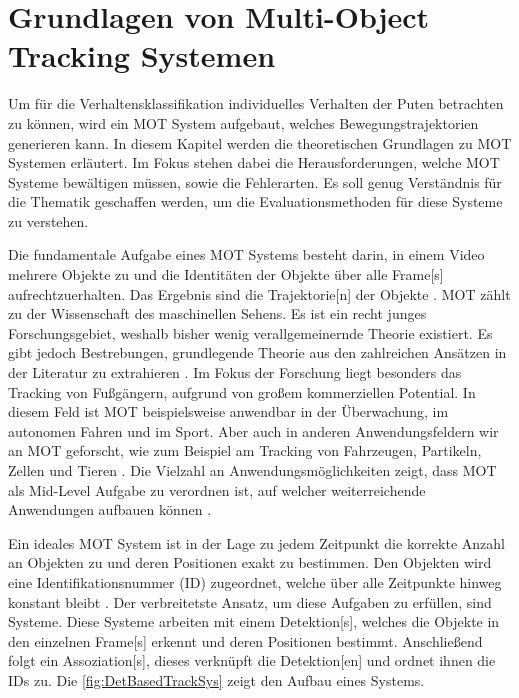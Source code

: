 \section{Grundlagen von Multi-Object Tracking Systemen} \label{sec:MOT Grundlagen}

Um für die Verhaltensklassifikation individuelles Verhalten der Puten betrachten zu können, wird ein \gls{MOT} System aufgebaut, welches Bewegungstrajektorien generieren kann. In diesem Kapitel werden die theoretischen Grundlagen zu \gls{MOT} Systemen erläutert. Im Fokus stehen dabei die Herausforderungen, welche \gls{MOT} Systeme bewältigen müssen, sowie die Fehlerarten. Es soll genug Verständnis für die Thematik geschaffen werden, um die Evaluationsmethoden für diese Systeme zu verstehen. 

Die fundamentale Aufgabe eines \gls{MOT} Systems besteht darin, in einem Video mehrere Objekte zu  und die Identitäten der Objekte über alle \gls{Frame}[s] aufrechtzuerhalten. Das Ergebnis sind die \gls{Trajektorie}[n] der Objekte \cite{CLEAR.2008, HOTA, Luo.2022}. \gls{MOT} zählt zu der Wissenschaft des maschinellen Sehens. Es ist ein recht junges Forschungsgebiet, weshalb bisher wenig verallgemeinernde Theorie existiert. Es gibt jedoch Bestrebungen, grundlegende Theorie aus den zahlreichen Ansätzen in der Literatur zu extrahieren \cite{Luo.2022}. Im Fokus der Forschung liegt besonders das Tracking von Fußgängern, aufgrund von großem kommerziellen Potential. In diesem Feld ist \gls{MOT} beispielsweise anwendbar in der Überwachung, im autonomen Fahren und im Sport. Aber auch in anderen Anwendungsfeldern wir an \gls{MOT} geforscht, wie zum Beispiel am Tracking von Fahrzeugen, Partikeln, Zellen und Tieren \cite{Luo.2022, CLEAR.2008, Crocker.1996}. Die Vielzahl an Anwendungsmöglichkeiten zeigt, dass \gls{MOT} als \gls{Mid-Level Aufgabe} zu verordnen ist, auf welcher weiterreichende Anwendungen aufbauen können \cite{Luo.2022}.\par

Ein ideales \gls{MOT} System ist in der Lage zu jedem Zeitpunkt die korrekte Anzahl an Objekten zu  und deren Positionen exakt zu bestimmen. Den Objekten wird eine Identifikationsnummer (\acrshort{ID}) zugeordnet, welche über alle Zeitpunkte hinweg konstant bleibt \cite{CLEAR.2008}. Der verbreitetste Ansatz, um diese Aufgaben zu erfüllen, sind  Systeme. Diese Systeme arbeiten mit einem \gls{Detektion}[s], welches die Objekte in den einzelnen \gls{Frame}[s] erkennt und deren Positionen bestimmt. Anschließend folgt ein \gls{Assoziation}[s], dieses verknüpft die \gls{Detektion}[en] und ordnet ihnen die \acrshort{ID}s zu\cite{Luo.2022, HOTA}. Die \autoref{fig:DetBasedTrackSys} zeigt den Aufbau eines  Systems. 


